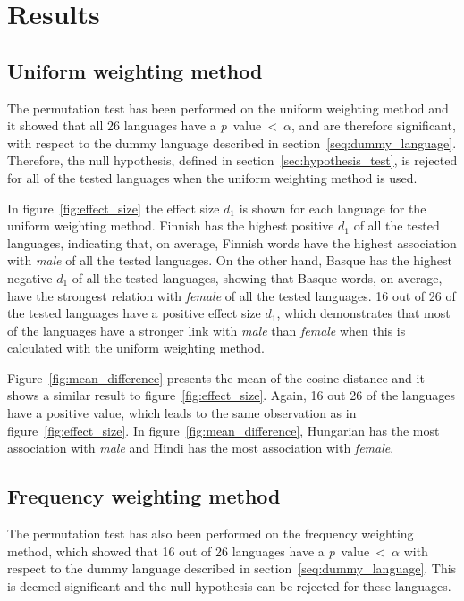 \section{Results} \label{ch:results}

\subsection{Uniform weighting method}
The permutation test has been performed on the uniform weighting method and it showed that
all 26 languages have a \mbox{\emph{p} value < $\alpha$}, and are
therefore significant, with respect to
the dummy language described in section~\ref{seq:dummy_language}. 
Therefore, the null hypothesis, defined in section~\ref{sec:hypothesis_test},
is rejected for all of the tested languages when
the uniform weighting method is used.

In figure~\ref{fig:effect_size} the effect size $d_1$ is shown for each language for the
uniform weighting method.
Finnish has the highest positive $d_1$ of all the tested languages, indicating that,
on average,
Finnish words have the highest association with \emph{male} of all the tested languages.
On the other hand, Basque has the highest negative $d_1$ of all the tested languages,
showing that Basque words, on average, have the strongest relation with \emph{female} of
all the tested languages.
16 out of 26 of the tested languages have a positive effect size $d_1$, which demonstrates that most of
the languages have a stronger link with \emph{male} than \emph{female} when this
is calculated with the uniform weighting method.

Figure~\ref{fig:mean_difference} presents the mean of the cosine distance and it
shows a similar result to figure~\ref{fig:effect_size}. Again, 16 out 26 of the languages
have a positive value, which leads to the same observation as in
figure~\ref{fig:effect_size}. In figure~\ref{fig:mean_difference}, Hungarian has the most 
association with \emph{male} and Hindi has the most association with \emph{female}.

\subsection{Frequency weighting method}
The permutation test has also been performed on the frequency weighting method,
which showed that 16 out of 26 languages have a \mbox{\emph{p} value < $\alpha$} with respect to
the dummy language described in section~\ref{seq:dummy_language}. This is deemed
significant and the null hypothesis can be rejected for these languages.

